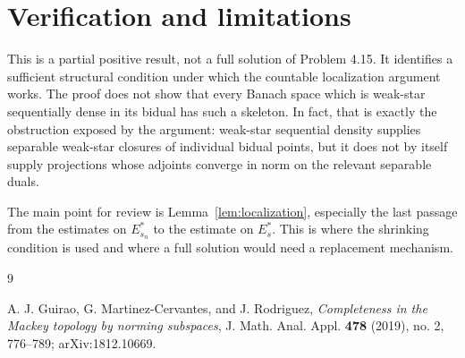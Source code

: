 \documentclass[11pt]{article}
\begin{document}
\section*{Verification and limitations}

This is a partial positive result, not a full solution of Problem 4.15.  It
identifies a sufficient structural condition under which the countable
localization argument works.  The proof does not show that every Banach space
which is weak-star sequentially dense in its bidual has such a skeleton.  In
fact, that is exactly the obstruction exposed by the argument: weak-star
sequential density supplies separable weak-star closures of individual
bidual points, but it does not by itself supply projections whose adjoints
converge in norm on the relevant separable duals.

The main point for review is Lemma~\ref{lem:localization}, especially the last
passage from the estimates on $E_{s_n}^*$ to the estimate on $E_s^*$.  This is
where the shrinking condition is used and where a full solution would need a
replacement mechanism.

\begin{thebibliography}{9}

A. J. Guirao, G. Martinez-Cervantes, and J. Rodriguez,
\emph{Completeness in the Mackey topology by norming subspaces},
J. Math. Anal. Appl. \textbf{478} (2019), no. 2, 776--789;
arXiv:1812.10669.

\end{thebibliography}
\end{document}
